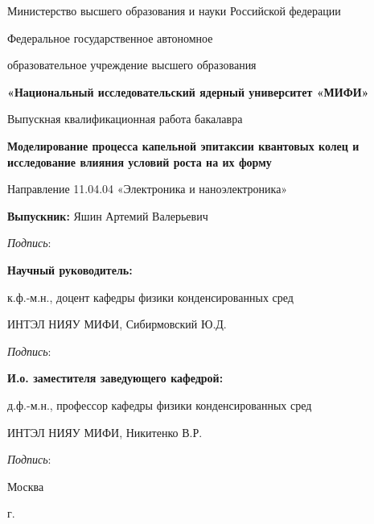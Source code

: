 \begin{titlepage}
\begin{center}
{Министерство высшего образования и науки Российской федерации}

{Федеральное государственное автономное}

{образовательное учреждение высшего образования}

{\textbf{«Национальный исследовательский ядерный университет «МИФИ»}}

\vspace{20mm}

Выпускная квалификационная работа бакалавра

\textbf{\large Моделирование процесса капельной эпитаксии квантовых колец и исследование влияния условий роста на их форму}

\vspace{10mm}
Направление 11.04.04 «Электроника и наноэлектроника»\\

\vspace{10mm}

\begin{flushleft}
\textbf{Выпускник:} Яшин Артемий Валерьевич

\hspace{10cm} \textit{Подпись}: \space \hrulefill

\textbf{Научный руководитель:} 

к.ф.-м.н., доцент кафедры физики конденсированных сред

ИНТЭЛ НИЯУ МИФИ, Сибирмовский Ю.Д.

\hspace{10cm} \textit{Подпись}: \space \hrulefill

\textbf{И.о. заместителя заведующего кафедрой:} 

д.ф.-м.н., профессор кафедры физики конденсированных сред 

ИНТЭЛ НИЯУ МИФИ, Никитенко В.Р.

\hspace{10cm} \textit{Подпись}: \space \hrulefill \space
\end{flushleft}

\vfill

{Москва}
\par{\the\year{} г.}
\end{center}
\end{titlepage}